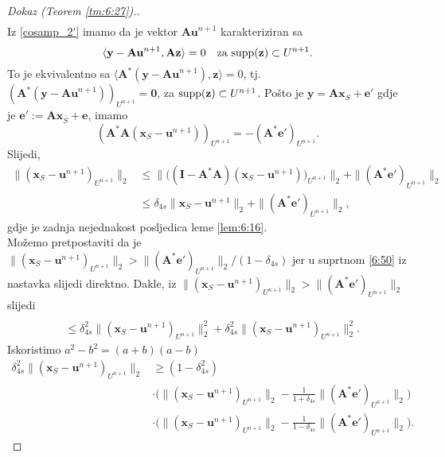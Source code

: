 \documentclass[a4paper,twoside,12pt]{memoir} %
\newcommand{\vect}[1]{\mathbf{#1}}
\renewcommand{\vec}{\vect}
\newcommand{\supp}{\text{\normalfont{supp}}}
\newcommand{\norm}[1]{\|{#1}\|}
\begin{document}
\begin{proof}[Dokaz (Teorem \ref{tm:6:27}).]
\begin{align}
    \end{align}
    Iz \eqref{cosamp_2'} imamo da je vektor $\vec {Au}^{n+1}$ karakteriziran sa
    \begin{equation*}
        \langle \vec y - \vec {Au}^{n+1}, \vec{Az}\rangle  = 0 \quad \text{za } \supp(\vec z) \subset U^{n+1}.
    \end{equation*}
    To je ekvivalentno sa $ \langle \vec A^*(\vec y - \vec{Au}^{n+1}), \vec z \rangle = 0$, tj. $(\vec A^*(\vec y - \vec{Au}^{n+1}))_{U^{n+1}} = \vec 0$, za $\supp(\vec z) \subset U^{n+1}$. Po\v{s}to je $\vec y = \vec{Ax}_S + \vec e'$ gdje je $\vec e' := \vec{Ax}_{\bar S} + \vec e$, imamo
    \begin{equation*}
        (\vec A^* \vec A(\vec x_S - \vec u^{n+1}))_{U^{n+1}} = - (\vec A^* \vec e')_{U^{n+1}}.
    \end{equation*}
    Slijedi,
    \begin{align*}
        \norm{(\vec x_S - \vec u^{n+1})_{U^{n+1}}}_2 &\leq \norm{\big( (\vec I - \vec A^* \vec A)(\vec x_S - \vec u^{n+1}) \big)_{U^{n+1}}}_2 + \norm{(\vec A^* \vec e')_{U^{n+1}}}_2 \\[0.5em]
        & \leq \delta_{4s}\norm{\vec x_S - \vec u^{n+1}}_2 + \norm{(\vec A^*\vec e')_{U^{n+1}}}_2,
    \end{align*}
    gdje je zadnja nejednakost posljedica leme \ref{lem:6:16}. \\
    Mo\v{z}emo pretpostaviti da je $\norm{(\vec x_S - \vec u^{n+1})_{U^{n+1}}}_2 > \norm{(\vec A^* \vec e')_{U^{n+1}}}_2/(1-\delta_{4s})$ jer u suprtnom \eqref{6:50} iz nastavka slijedi direktno. Dakle, iz $\norm{(\vec x_S - \vec u^{n+1})_{U^{n+1}}}_2 > \norm{(\vec A^* \vec e')_{U^{n+1}}}_2$ slijedi
    \begin{align*}
        [\norm{(\vec x_S - \vec u^{n+1}_{U^{n+1}})}_2 &- \norm{(\vec A^* \vec e')_{U^{n+1}}}_2] \\[0.5em]
        & \leq \delta_{4s}^2 \norm{(\vec x_S - \vec u^{n+1})_{U^{n+1}}}_2^2 + \delta_{4s}^2 \norm{(\vec x_S - \vec u^{n+1})_{\overline{U^{n+1}}}}_2^2.
    \end{align*}
    Iskoristimo $a^2 - b^2 = (a+b)(a-b)$
    \begin{align*}
        \delta_{4s}^2 \norm{(\vec x_S - \vec u^{n+1})_{\overline{U^{n+1}}}}_2 &\geq (1-\delta_{4s}^2)\\[0.5em]
        & \cdot \big( \norm{(\vec x_S - \vec u^{n+1})_{U^{n+1}}}_2 - \frac{1}{1+\delta_{4s}} \norm{(\vec A^* \vec e')_{U^{n+1}}}_2  \big)\\[0.5em]
        & \cdot \big( \norm{(\vec x_S - \vec u^{n+1})_{U^{n+1}}}_2 - \frac{1}{1-\delta_{4s}} \norm{(\vec A^* \vec e')_{U^{n+1}}}_2  \big).

\end{align*}
\end{proof}
\end{document}
